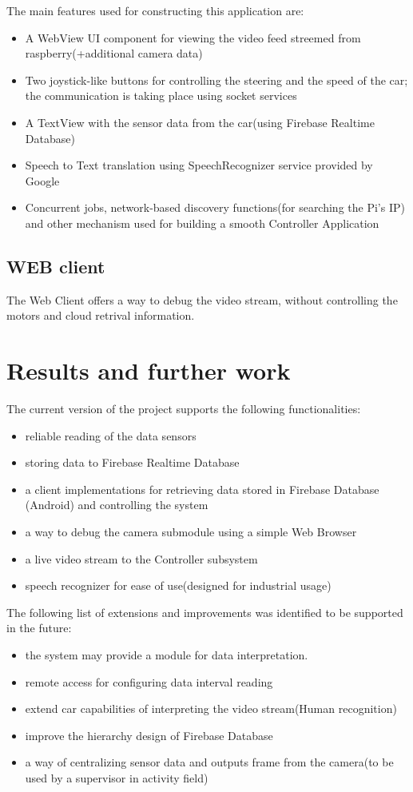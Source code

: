 \documentclass[a4paper,11pt]{article}
\begin{document}
The main features used for constructing this application are:
\begin{itemize} 
\item A WebView UI component for viewing the video feed streemed from raspberry(+additional camera data)
\item Two joystick-like buttons for controlling the steering and the speed of the car; the communication is taking place using socket services
\item A TextView with the sensor data from the car(using Firebase Realtime Database)
\item Speech to Text translation using SpeechRecognizer service provided by Google
\item Concurrent jobs, network-based discovery functions(for searching the Pi's IP) and other mechanism used for building a smooth Controller Application
\end{itemize}

\subsection{WEB client}

The Web Client offers a way to debug the video stream, without controlling the motors and cloud retrival information.\\


\section{Results and further work}

The current version of the project supports the following functionalities:
\begin{itemize}  
\item reliable reading of the data sensors
\item storing data to Firebase Realtime Database
\item a client implementations for retrieving data stored in Firebase Database (Android) and controlling the system
\item a way to debug the camera submodule using a simple Web Browser
\item a live video stream to the Controller subsystem
\item speech recognizer for ease of use(designed for industrial usage)
\end{itemize}

The following list of extensions and improvements was identified to be supported in the future:
\begin{itemize}  
\item the system may provide a module for data interpretation.
\item remote access for configuring data interval reading
\item extend car capabilities of interpreting the video stream(Human recognition)
\item improve the hierarchy design of Firebase Database
\item a way of centralizing sensor data and outputs frame from the camera(to be used by a supervisor in activity field)
\end{itemize}
\end{document}
